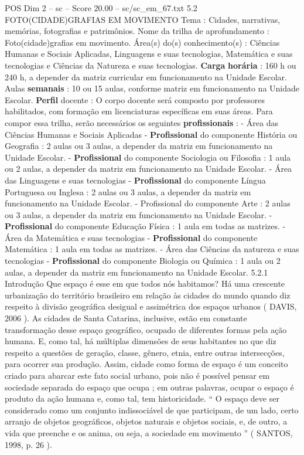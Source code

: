 \begin{textsample}{POS Dim 2 – sc – Score 20.00 – sc/sc\_em\_67.txt}  \label{ex:f2_pos_016}
5.2 FOTO(CIDADE)GRAFIAS EM MOVIMENTO Tema : Cidades, narrativas, memórias, fotografias e patrimônios.
Nome da trilha de aprofundamento : Foto(cidade)grafias em movimento.
Área(s) do(s) conhecimento(s) : Ciências Humanas e Sociais Aplicadas, Linguagens e suas tecnologias, Matemática e suas tecnologias e Ciências da Natureza e suas tecnologias. \textbf{Carga} \textbf{horária} : 160 h ou 240 h, a depender da matriz curricular em funcionamento na Unidade Escolar.
Aulas \textbf{semanais} : 10 ou 15 aulas, conforme matriz em funcionamento na Unidade Escolar. \textbf{Perfil} docente : O corpo docente será composto por professores habilitados, com formação em licenciaturas específicas em suas áreas.
Para compor essa trilha, serão necessários os seguintes \textbf{profissionais} : - Área das Ciências Humanas e Sociais Aplicadas - \textbf{Profissional} do componente História ou Geografia : 2 aulas ou 3 aulas, a depender da matriz em funcionamento na Unidade Escolar. - \textbf{Profissional} do componente Sociologia ou Filosofia : 1 aula ou 2 aulas, a depender da matriz em funcionamento na Unidade Escolar. - Área das Linguagens e suas tecnologias - \textbf{Profissional} do componente Língua Portuguesa ou Inglesa : 2 aulas ou 3 aulas, a depender da matriz em funcionamento na Unidade Escolar. - Profissional do componente Arte : 2 aulas ou 3 aulas, a depender da matriz em funcionamento na Unidade Escolar. - \textbf{Profissional} do componente Educação Física : 1 aula em todas as matrizes. - Área da Matemática e suas tecnologias - \textbf{Profissional} do componente Matemática : 1 aula em todas as matrizes. - Área das Ciências da natureza e suas tecnologias - \textbf{Profissional} do componente Biologia ou Química : 1 aula ou 2 aulas, a depender da matriz em funcionamento na Unidade Escolar. 5.2.1 Introdução Que espaço é esse em que todos nós habitamos?
Há uma crescente urbanização do território brasileiro em relação às cidades do mundo quando diz respeito à divisão geográfica desigual e assimétrica dos espaços urbanos ( DAVIS, 2006 ).
As cidades de Santa Catarina, inclusive, estão em constante transformação desse espaço geográfico, ocupado de diferentes formas pela ação humana.
E, como tal, há múltiplas dimensões de seus habitantes no que diz respeito a questões de geração, classe, gênero, etnia, entre outras intersecções, para ocorrer sua produção.
Assim, cidade como forma de espaço é um conceito criado para abarcar este fato social urbano, pois não é possível pensar em sociedade separada do espaço que ocupa ; em outras palavras, ocupar o espaço é produto da ação humana e, como tal, tem historicidade. “ O espaço deve ser considerado como um conjunto indissociável de que participam, de um lado, certo arranjo de objetos geográficos, objetos naturais e objetos sociais, e, de outro, a vida que preenche e os anima, ou seja, a sociedade em movimento ” ( SANTOS, 1998, p. 26 ).

\end{textsample}
